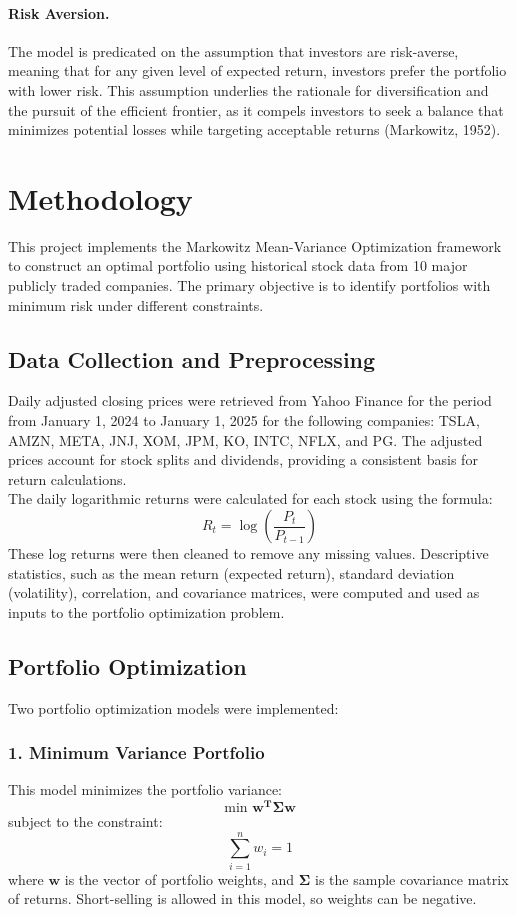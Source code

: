 \documentclass[12pt]{article}
\begin{document}
\paragraph{Risk Aversion.} The model is predicated on the assumption that investors are risk-averse, meaning that for any given level of expected return, investors prefer the portfolio with lower risk. This assumption underlies the rationale for diversification and the pursuit of the efficient frontier, as it compels investors to seek a balance that minimizes potential losses while targeting acceptable returns (Markowitz, 1952).

\section{Methodology}
This project implements the Markowitz Mean-Variance Optimization framework to construct an optimal portfolio using historical stock data from 10 major publicly traded companies. The primary objective is to identify portfolios with minimum risk under different constraints.

\subsection*{Data Collection and Preprocessing}
Daily adjusted closing prices were retrieved from Yahoo Finance for the period from January 1, 2024 to January 1, 2025 for the following companies: TSLA, AMZN, META, JNJ, XOM, JPM, KO, INTC, NFLX, and PG. The adjusted prices account for stock splits and dividends, providing a consistent basis for return calculations. \\
The daily logarithmic returns were calculated for each stock using the formula:
\[R_t=\log \left (\frac{P_t}{P_{t-1}} \right )\]
These log returns were then cleaned to remove any missing values. Descriptive statistics, such as the mean return (expected return), standard deviation (volatility), correlation, and covariance matrices, were computed and used as inputs to the portfolio optimization problem.

\subsection*{Portfolio Optimization}
Two portfolio optimization models were implemented:

\subsubsection*{1. Minimum Variance Portfolio}
This model minimizes the portfolio variance:
\[\text{min } \mathbf{w^T\Sigma w}\]
subject to the constraint:
\[\sum_{i=1}^n w_i=1\]
where $\mathbf{w}$ is the vector of portfolio weights, and $\mathbf{\Sigma}$ is the sample covariance matrix of returns. Short-selling is allowed in this model, so weights can be negative.
\end{document}
